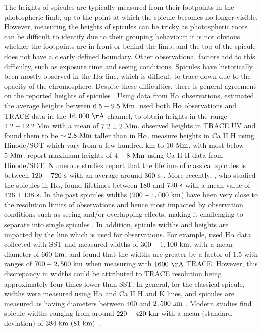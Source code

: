 \documentclass[12pt]{ociamthesis}
\newcommand{\np}{\\ \\}
\begin{document}
%
The heights of spicules are typically measured from their footpoints in the photospheric limb, up to the point at which the spicule becomes no longer visible. However, measuring the heights of spicules can be tricky as photospheric roots can be difficult to identify due to their grouping behaviour; it is not obvious whether the footpoints are in front or behind the limb, and the top of the spicule does not have a clearly defined boundary. Other observational factors add to this difficulty, such as exposure time and seeing conditions. Spicules have historically been mostly observed in the H$\alpha$ line, which is difficult to trace down due to the opacity of the chromosphere. Despite these difficulties, there is general agreement on the reported heights of spicules \citep{Tsiropoula2012}. Using data from H$\alpha$ observations, \cite{Beckers1968, Beckers1972ARA&A} estimated the average heights between $6.5-9.5~\rm{Mm}$. \cite{Pasachoff2009SoPh26059P} used both H$\alpha$ observations and TRACE data in the $16,000~\rm{ \AA}$ channel, to obtain heights in the range $4.2-12.2~\rm{Mm}$ with a mean of $7.2\pm2~\rm{Mm}$. \cite{Pasachoff2009SoPh26059P} observed heights in TRACE UV and found them to be $\sim 2.8~\rm{Mm}$ taller than in H$\alpha$. \cite{Pontieu2007PASJ} measure heights in Ca II H using Hinode/SOT which vary from a few hundred km to $10~\rm{Mm}$, with most below $5~\rm{Mm}$. \cite{Pereira2012} report maximum heights of $4-8~\rm{Mm}$ using Ca II H data from Hinode/SOT. Numerous studies report that the lifetime of classical spicules is between $120-720~\rm{s}$ with an average around $300~\rm{s}$ \citep{Roberts1945ApJ,Rush1954AuJPh7230R, Lippincott1957SCoA215L, Alissandrakis1971SoPh2047A, Cook1984AdSpR459C, Georgakilas1999AA341610G}. More recently, \cite{Pasachoff2009SoPh26059P}, who studied the spicules in H$\alpha$, found lifetimes between $180$ and $720~\rm{s}$ with a mean value of $426\pm138~\rm{s}$.
% 
In the past spicules widths ($200-1,000~\rm{km}$) have been very close to the resolution limits of observations and hence most impacted by observation conditions such as seeing and/or overlapping effects, making it challenging to separate into single spicules \citep{Pontieu2007ASPC, Tsiropoula2012}. In addition, spicule widths and heights are impacted by the line which is used for observations. For example, \cite{Pasachoff2009SoPh26059P} used H$\alpha$ data collected with SST and measured widths of $300-1,100~\rm{km}$, with a mean diameter of $660~\rm{km}$, and found that the widths are greater by a factor of $1.5$ with ranges of $700-2,500~\rm{km}$ when measuring with $1600~\rm{\AA}$ TRACE. However, this discrepancy in widths could be attributed to TRACE resolution being approximately four times lower than SST. In general, for the classical spicule, widths were measured using H$\alpha$ and Ca II H and K lines, and spicules are measured as having diameters between $400$ and $2,500~\rm{km}$ \citep{Dunn1960Obs8031D, Beckers1968, Beckers1972ARA&A, Lynch1973SoPh3063L}. Modern studies find spicule widths ranging from around $220-420~\rm{km}$ with a mean (standard deviation) of $384~\rm{km}~(81~\rm{km})$ \cite{Pereira2012}. \np
\end{document}
